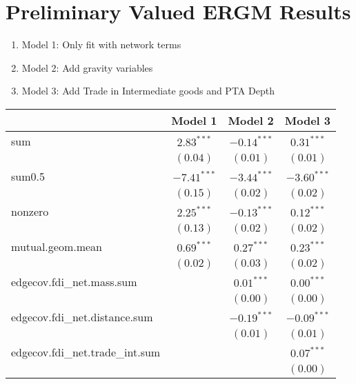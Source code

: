 \documentclass{article}
\begin{document}
\section{Preliminary Valued ERGM Results}

\begin{enumerate}
\item Model 1: Only fit with network terms
\item Model 2: Add gravity variables
\item Model 3: Add Trade  in Intermediate goods and PTA Depth	
\end{enumerate}



\begin{table}[!htb]
\begin{center}
\begin{tabular}{l c c c }
\hline
 & Model 1 & Model 2 & Model 3 \\
\hline
sum                             & $2.83^{***}$  & $-0.14^{***}$ & $0.31^{***}$  \\
                                & $(0.04)$      & $(0.01)$      & $(0.01)$      \\
sum0.5                          & $-7.41^{***}$ & $-3.44^{***}$ & $-3.60^{***}$ \\
                                & $(0.15)$      & $(0.02)$      & $(0.02)$      \\
nonzero                         & $2.25^{***}$  & $-0.13^{***}$ & $0.12^{***}$  \\
                                & $(0.13)$      & $(0.02)$      & $(0.02)$      \\
mutual.geom.mean                & $0.69^{***}$  & $0.27^{***}$  & $0.23^{***}$  \\
                                & $(0.02)$      & $(0.03)$      & $(0.02)$      \\
edgecov.fdi\_net.mass.sum       &               & $0.01^{***}$  & $0.00^{***}$  \\
                                &               & $(0.00)$      & $(0.00)$      \\
edgecov.fdi\_net.distance.sum   &               & $-0.19^{***}$ & $-0.09^{***}$ \\
                                &               & $(0.01)$      & $(0.01)$      \\
edgecov.fdi\_net.trade\_int.sum &               &               & $0.07^{***}$  \\
                                &               &               & $(0.00)$      \\

\end{tabular}
\end{center}
\end{table}
\end{document}
